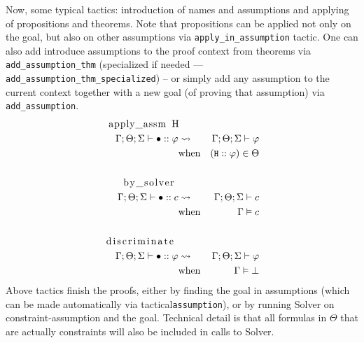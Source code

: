 \documentclass[english, mgr]{iithesis}
\renewcommand{\tt}[1]{\texttt{\small{#1}}}
\begin{document}
Now, some typical tactics: introduction of names and assumptions and applying of
propositions and theorems.
Note that propositions can be applied not only on the goal, but also on other
assumptions via \tt{apply\_in\_assumption} tactic.
One can also add introduce assumptions to the proof context from theorems via \tt{add\_assumption\_thm}
(specialized if needed --- \tt{add\_assumption\_thm\_specialized}) --
or simply add any assumption to the current context together with a new goal (of proving that assumption)
via \tt{add\_assumption}.
\begin{eqnarray*}  \text{\lstinline[columns=fixed]{apply_assm H}} & & \\
    \jgmnt[\Gamma; \Theta; \Sigma]{\hole\ofkind{{\formphi}}} & \leadsto & \jgmnt[\Gamma; \Theta; \Sigma]{\formphi} \\
   & \text{when} & (\tt{H} \ofkind {\formphi }) \in \Theta \\
  & & \\
  \text{\lstinline[columns=fixed]{by_solver} }& & \\
  \jgmnt[\Gamma; \Theta; \Sigma]{\hole\ofkind{{\constr}}} & \leadsto & \jgmnt[\Gamma; \Theta; \Sigma]{\constr} \\
   & \text{when} & \cjgmnt[\Gamma]{\constr}\\
  & & \\
  \text{\lstinline[columns=fixed]{discriminate} }& & \\
  \jgmnt[\Gamma; \Theta; \Sigma]{\hole\ofkind{{\formphi}}} & \leadsto & \jgmnt[\Gamma; \Theta; \Sigma]{\formphi} \\
   & \text{when} & \cjgmnt[\Gamma]{\bot}
  \end{eqnarray*}
Above tactics finish the proofs, either by finding the goal in assumptions
(which can be made automatically via tactical\tt{assumption}),
or by running Solver on constraint-assumption and the goal.
Technical detail is that all formulas in $\Theta$ that are actually constraints
will also be included in calls to Solver.
\end{document}
